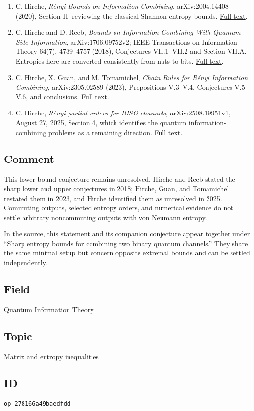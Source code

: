 \begin{enumerate}[label={},leftmargin=4.8em,labelsep=0.5em]
  \footnotesize
  \item[\textup{[Hirche20]}]\label{ref:2781-hirche20}
  C. Hirche, \emph{Rényi Bounds on Information Combining}, arXiv:2004.14408 (2020), Section II, reviewing the classical Shannon-entropy bounds. \href{https://arxiv.org/html/2004.14408v1}{Full text}.

  \item[\textup{[Hirche18]}]\label{ref:2781-hirche18}
  C. Hirche and D. Reeb, \emph{Bounds on Information Combining With Quantum Side Information}, arXiv:1706.09752v2; IEEE Transactions on Information Theory 64(7), 4739–4757 (2018), Conjectures VII.1–VII.2 and Section VII.A. Entropies here are converted consistently from nats to bits. \href{https://arxiv.org/html/1706.09752v2}{Full text}.

  \item[\textup{[Hirche23]}]\label{ref:2781-hirche23}
  C. Hirche, X. Guan, and M. Tomamichel, \emph{Chain Rules for Rényi Information Combining}, arXiv:2305.02589 (2023), Propositions V.3–V.4, Conjectures V.5–V.6, and conclusions. \href{https://arxiv.org/html/2305.02589}{Full text}.

  \item[\textup{[Hirche25]}]\label{ref:2781-hirche25}
  C. Hirche, \emph{Rényi partial orders for BISO channels}, arXiv:2508.19951v1, August 27, 2025, Section 4, which identifies the quantum information-combining problems as a remaining direction. \href{https://arxiv.org/html/2508.19951}{Full text}.
\end{enumerate}

\subsection*{Comment}

This lower-bound conjecture remains unresolved. Hirche and Reeb stated the sharp lower and upper conjectures in 2018; Hirche, Guan, and Tomamichel restated them in 2023, and Hirche identified them as unresolved in 2025. Commuting outputs, selected entropy orders, and numerical evidence do not settle arbitrary noncommuting outputs with von Neumann entropy.

In the source, this statement and its companion conjecture appear together under “Sharp entropy bounds for combining two binary quantum channels.” They share the same minimal setup but concern opposite extremal bounds and can be settled independently.

\subsection*{Field}

Quantum Information Theory

\subsection*{Topic}

Matrix and entropy inequalities

\subsection*{ID}

\texttt{op\_278166a49baedfdd}
